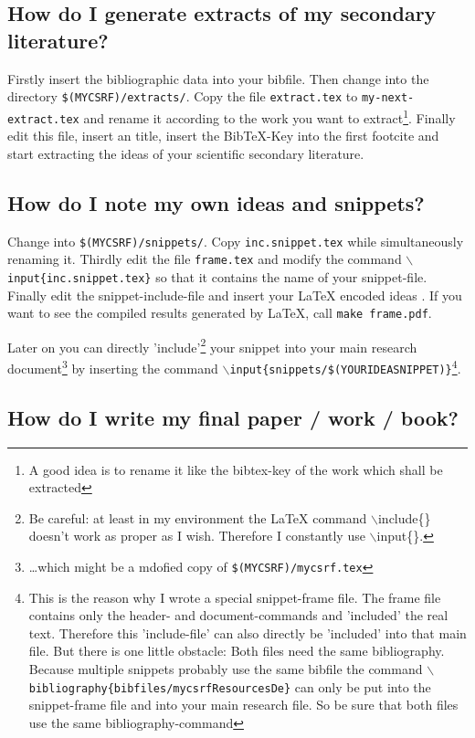 \documentclass[
  DIV=calc,
  BCOR=5mm,
  11pt,
  headings=small,
  oneside,
  abstract=true,
  toc=bib,
  ngerman,english]{scrartcl}
\begin{document}
\subsection{How do I generate extracts of my secondary literature?}
Firstly insert the bibliographic data into your bibfile. Then change into the
directory \texttt{\$(MYCSRF)/extracts/}. Copy the file \texttt{extract.tex} to
\texttt{my-next-extract.tex} and rename it according to the work you want to
extract\footnote{A good idea is to rename it like the bibtex-key of the work
which shall be extracted}. Finally edit this file, insert an title, insert the
BibTeX-Key into the first footcite and start extracting the ideas of your
scientific secondary literature.

\subsection{How do I note my own ideas and snippets?}
Change into \texttt{\$(MYCSRF)/snippets/}. Copy \texttt{inc.snippet.tex}
while simultaneously renaming it. Thirdly edit the file
\texttt{frame.tex} and modify the command
\texttt{$\backslash$input\{inc.snippet.tex\}} so that it contains the name of
your snippet-file. Finally edit the snippet-include-file and insert your LaTeX
encoded ideas . If you want to see the compiled results generated by LaTeX, call
\texttt{make frame.pdf}.

Later on you can directly 'include'\footnote{Be careful: at least in my
environment the LaTeX command $\backslash$include\{\} doesn't work as proper as
I wish. Therefore I constantly use $\backslash$input\{\}.} your snippet into
your main research document\footnote{\ldots which might be a mdofied copy of
\texttt{\$(MYCSRF)/mycsrf.tex}} by inserting the command
\texttt{$\backslash$input\{snippets/\$(YOURIDEASNIPPET)\}}\footnote{This is the
reason why I wrote a special snippet-frame file. The frame file contains only
the header- and document-commands and 'included' the real text. Therefore this
'include-file' can also directly be 'included' into that main file. But there is
one little obstacle: Both files need the same bibliography. Because multiple
snippets probably use the same bibfile the command
\texttt{$\backslash$bibliography\{\-bibfiles/\-mycsrfResourcesDe\}} can only be
put into the snippet-frame file and into your main research file. So be sure
that both files use the same bibliography-command}.

\subsection{How do I write my final paper / work / book?}
\end{document}
